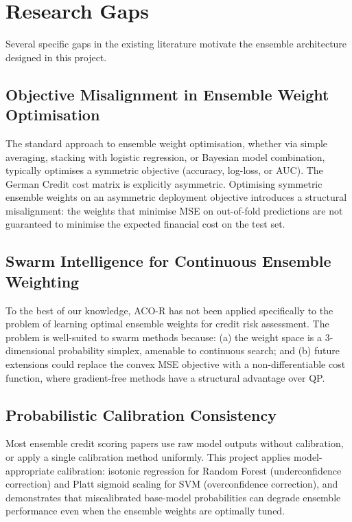 \documentclass[12pt,a4paper]{article}
\begin{document}
\section{Research Gaps}

Several specific gaps in the existing literature motivate the ensemble architecture designed in this project.

\subsection{Objective Misalignment in Ensemble Weight Optimisation}

The standard approach to ensemble weight optimisation, whether via simple averaging, stacking with logistic regression, or Bayesian model combination, typically optimises a symmetric objective (accuracy, log-loss, or AUC). The German Credit cost matrix is explicitly asymmetric. Optimising symmetric ensemble weights on an asymmetric deployment objective introduces a structural misalignment: the weights that minimise MSE on out-of-fold predictions are not guaranteed to minimise the expected financial cost on the test set.

\subsection{Swarm Intelligence for Continuous Ensemble Weighting}

To the best of our knowledge, ACO-R has not been applied specifically to the problem of learning optimal ensemble weights for credit risk assessment. The problem is well-suited to swarm methods because: (a) the weight space is a 3-dimensional probability simplex, amenable to continuous search; and (b) future extensions could replace the convex MSE objective with a non-differentiable cost function, where gradient-free methods have a structural advantage over QP.

\subsection{Probabilistic Calibration Consistency}

Most ensemble credit scoring papers use raw model outputs without calibration, or apply a single calibration method uniformly. This project applies model-appropriate calibration: isotonic regression for Random Forest (underconfidence correction) and Platt sigmoid scaling for SVM (overconfidence correction), and demonstrates that miscalibrated base-model probabilities can degrade ensemble performance even when the ensemble weights are optimally tuned.
\end{document}
